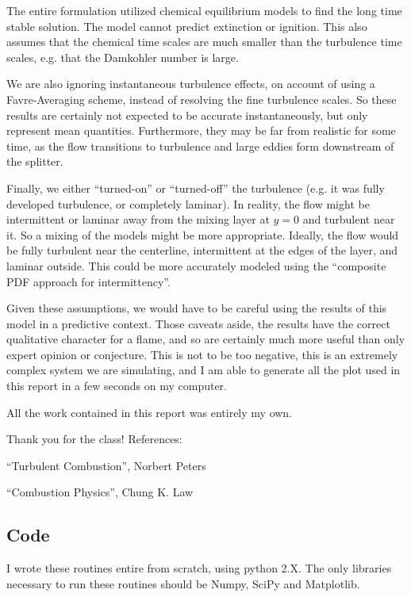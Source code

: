 \documentclass{article}
\begin{document}
The entire formulation utilized chemical
equilibrium models to find the long time stable solution. The model
cannot predict extinction or ignition. This also assumes that the
chemical time scales are much smaller than the turbulence time scales,
e.g. that the Damkohler number is large. 

We are also ignoring instantaneous turbulence effects, on account of
using a Favre-Averaging scheme, instead of resolving the fine turbulence
scales. So these results are certainly not expected to be accurate
instantaneously, but only represent mean quantities. Furthermore, they may
be far from realistic for some time, as the flow transitions to
turbulence and large eddies form downstream of the splitter.  

Finally, we either ``turned-on'' or ``turned-off'' the turbulence
(e.g. it was fully developed turbulence, or completely laminar). In
reality, the flow might be intermittent or laminar away from the mixing
layer at $y=0$ and turbulent near it. So a mixing of the models might be
more appropriate. Ideally, the flow would be fully turbulent near the
centerline, intermittent at the edges of the layer, and laminar
outside. This could be more accurately modeled using the ``composite PDF
approach for intermittency''. 

Given these assumptions, we would have to be careful using the results
of this model in a predictive context. Those caveats aside, the results
have the correct qualitative character for a flame, and so are certainly
much more useful than only expert opinion or conjecture. This is not to be too
negative, this is an extremely complex system we are simulating, and I
am able to generate all the plot used in this report in a few seconds on
my computer. 


\newpage
All the work contained in this report was entirely my own. 

Thank you for the class! 
\vspace{1in}
\newline
References:

``Turbulent Combustion'', Norbert Peters

``Combustion Physics'', Chung K. Law


\subsection*{Code}
I wrote these routines entire from scratch, using python 2.X. The only
libraries necessary to run these routines should be Numpy, SciPy and
Matplotlib.  

\end{document}
